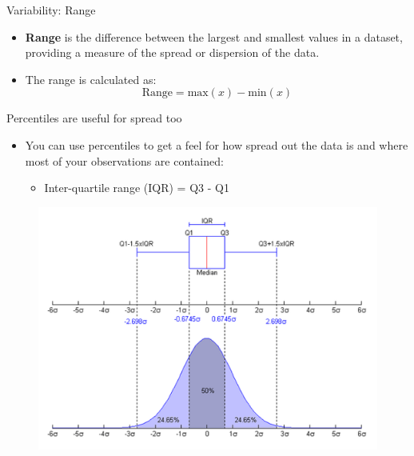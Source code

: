 \documentclass[
  ignorenonframetext,
]{beamer}
\providecommand{\tightlist}{%
  \setlength{\itemsep}{0pt}\setlength{\parskip}{0pt}}
\begin{document}
\begin{frame}{Variability: Range}
\label{variability-range}
\begin{itemize}
\tightlist
\item
  \textbf{Range} is the difference between the largest and smallest
  values in a dataset, providing a measure of the spread or dispersion
  of the data.
\end{itemize}

\begin{itemize}
\tightlist
\item
  The range is calculated as:
  \[\text{Range} = \text{max}(x) - \text{min}(x)\]
\end{itemize}
\end{frame}

\begin{frame}{Percentiles are useful for spread too}
\label{percentiles-are-useful-for-spread-too}
\begin{itemize}
\item
  You can use percentiles to get a feel for how spread out the data is
  and where most of your observations are contained:

  \begin{itemize}
  \tightlist
  \item
    Inter-quartile range (IQR) = Q3 - Q1
  \end{itemize}
\end{itemize}

\begin{figure}
\includegraphics[width=0.6\linewidth]{fig/iqr} \end{figure}
\end{frame}
\end{document}

